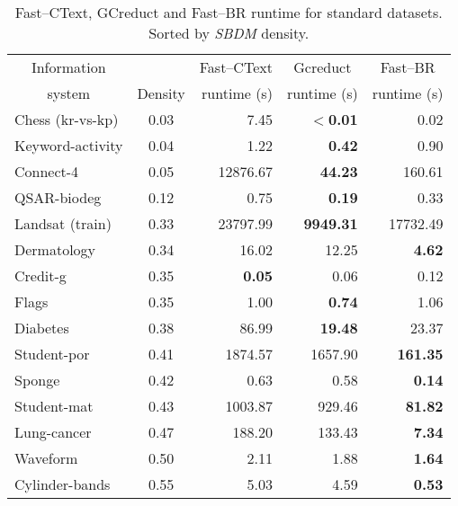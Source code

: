\documentclass[authoryear,11pt]{elsarticle}
\begin{document}
\begin{table}[htb]
	\centering
	\caption{Fast--CText, GCreduct and Fast--BR runtime for standard datasets. Sorted by \textit{SBDM} density.}
	\label{tab:density}
	\begin{tabular}{|l|c|r|r|r|}
		\hline
		\multicolumn{1}{|c|}{Information}  && Fast--CText & \multicolumn{1}{c|}{Gcreduct} & \multicolumn{1}{c|}{Fast--BR}  \\
		\multicolumn{1}{|c|}{system}       & Density & runtime (s) & runtime (s)  & runtime (s)  \\
		\hline
		Chess (kr-vs-kp)          & 0.03    & 7.45          & \textbf{$<$0.01} & 0.02            \\
		Keyword-activity          & 0.04    & 1.22          & \textbf{0.42}    & 0.90            \\
		Connect-4                 & 0.05    & 12876.67      & \textbf{44.23}   & 160.61          \\
		QSAR-biodeg               & 0.12    & 0.75          & \textbf{0.19}    & 0.33            \\
		Landsat (train)           & 0.33    & 23797.99      & \textbf{9949.31} & 17732.49        \\
		Dermatology               & 0.34    & 16.02         & 12.25            & \textbf{4.62}   \\
		Credit-g                  & 0.35    & \textbf{0.05} & 0.06             & 0.12            \\
		Flags                     & 0.35    & 1.00          & \textbf{0.74}    & 1.06            \\
		Diabetes                  & 0.38    & 86.99         & \textbf{19.48}   & 23.37           \\
		Student-por               & 0.41    & 1874.57       & 1657.90          & \textbf{161.35} \\
		Sponge                    & 0.42    & 0.63          & 0.58             & \textbf{0.14}   \\
		Student-mat               & 0.43    & 1003.87       & 929.46           & \textbf{81.82}  \\
		Lung-cancer               & 0.47    & 188.20        & 133.43           & \textbf{7.34}   \\
		Waveform                  & 0.50    & 2.11          & 1.88             & \textbf{1.64}   \\
		Cylinder-bands            & 0.55    & 5.03          & 4.59             & \textbf{0.53}   \\
		\hline
	\end{tabular}
\end{table}
\end{document}
